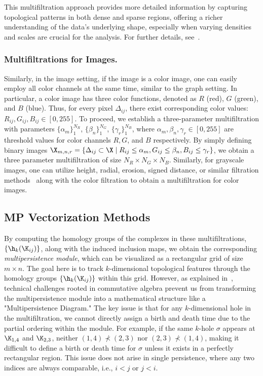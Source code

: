 This multifiltration approach provides more detailed information by capturing topological patterns in both dense and sparse regions, offering a richer understanding of the data's underlying shape, especially when varying densities and scales are crucial for the analysis. For further details, see~\cite{loiseaux2024framework,vipond2020multiparameter}.

\subsubsection{Multifiltrations for Images.} \label{sec:MP-image}

Similarly, in the image setting, if the image is a color image, one can easily employ all color channels at the same time, similar to the graph setting. In particular, a color image has three color functions, denoted as $R$ (red), $G$ (green), and $B$ (blue). Thus, for every pixel $\Delta_{ij}$, there exist corresponding color values: $R_{ij},G_{ij},B_{ij}\in [0,255]$. To proceed, we establish a three-parameter multifiltration with parameters $\{\alpha_m\}_1^{N_R}$, $\{\beta_n\}_1^{N_G}$, $\{\gamma_r\}_1^{N_B}$, where $\alpha_m,\beta_n,\gamma_r\in [0,255]$ are threshold values for color channels $R,G$, and $B$ respectively. By simply defining binary images $\X_{m,n,r}=\{\Delta_{ij}\subset \X \mid  R_{ij}\leq \alpha_m, G_{ij}\leq \beta_n, B_{ij}\leq \gamma_r\}$, we obtain a three parameter multifiltration of size $N_R \times N_G \times N_B$.
Similarly, for grayscale images, one can utilize height, radial, erosion, signed distance, or similar filtration methods~\cite{garin2019topological} along with the color filtration to obtain a multifiltration for color images.



\subsection{MP Vectorization Methods} \label{sec:MP-vec}

By computing the homology groups of the complexes in these multifiltrations, $\{\h_k(\K_{ij})\}$, along with the induced inclusion maps, we obtain the corresponding \textit{multipersistence module}, which can be visualized as a rectangular grid of size $m\times n$. The goal here is to track $k$-dimensional topological features through the homology groups $\{\h_k(\K_{ij})\}$ within this grid. However, as explained in~\cite{botnan2022introduction}, technical challenges rooted in commutative algebra prevent us from transforming the multipersistence module into a mathematical structure like a "Multipersistence Diagram." The key issue is that for any $k$-dimensional hole in the multifiltration, we cannot directly assign a birth and death time due to the partial ordering within the module. For example, if the same $k$-hole $\sigma$ appears at $\K_{1,4}$ and $\K_{2,3}$, neither $(1,4) \nprec (2,3)$ nor $(2,3) \nprec (1,4)$, making it difficult to define a birth or death time for $\sigma$ unless it exists in a perfectly rectangular region. This issue does not arise in single persistence, where any two indices are always comparable, i.e., $i<j$ or $j<i$.

